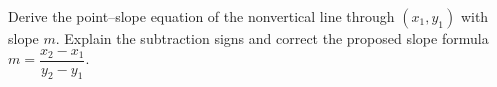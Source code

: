Derive the point--slope equation of the nonvertical line through $(x_1,y_1)$ with slope $m$. Explain the subtraction signs and correct the proposed slope formula $m=\dfrac{x_2-x_1}{y_2-y_1}$.

